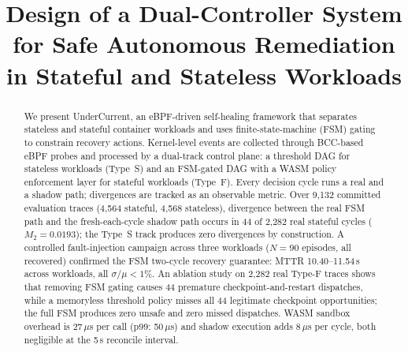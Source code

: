 \documentclass[conference]{IEEEtran}
\begin{document}
\title{Design of a Dual-Controller System for Safe Autonomous Remediation in Stateful and Stateless Workloads}

\author{%
\and
{}
\and
{}
}

\maketitle

\begin{abstract}
We present UnderCurrent, an eBPF-driven self-healing framework that separates stateless and stateful container workloads and uses finite-state-machine (FSM) gating to constrain recovery actions. Kernel-level events are collected through BCC-based eBPF probes and processed by a dual-track control plane: a threshold DAG for stateless workloads (Type~S) and an FSM-gated DAG with a WASM policy enforcement layer for stateful workloads (Type~F). Every decision cycle runs a real and a shadow path; divergences are tracked as an observable metric. Over 9,132 committed evaluation traces (4,564 stateful, 4,568 stateless), divergence between the real FSM path and the fresh-each-cycle shadow path occurs in 44 of 2,282 real stateful cycles ($M_2 = 0.0193$); the Type~S track produces zero divergences by construction. A controlled fault-injection campaign across three workloads ($N = 90$ episodes, all recovered) confirmed the FSM two-cycle recovery guarantee: MTTR 10.40--11.54\,s across workloads, all $\sigma/\mu < 1\%$. An ablation study on 2,282 real Type-F traces shows that removing FSM gating causes 44 premature checkpoint-and-restart dispatches, while a memoryless threshold policy misses all 44 legitimate checkpoint opportunities; the full FSM produces zero unsafe and zero missed dispatches. WASM sandbox overhead is 27\,$\mu$s per call (p99: 50\,$\mu$s) and shadow execution adds 8\,$\mu$s per cycle, both negligible at the 5\,s reconcile interval.
\end{abstract}
\end{document}
